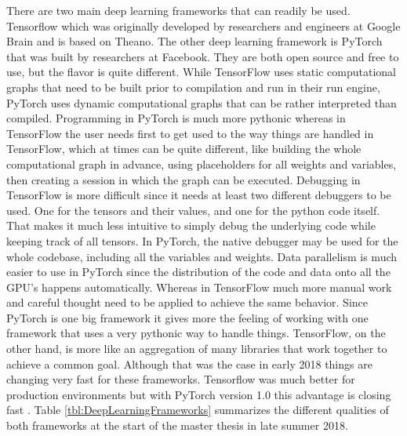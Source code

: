 There are two main deep learning frameworks that can readily be used. Tensorflow \cite{tensorflow} which was originally developed by researchers and engineers at Google Brain and is based on Theano. The other deep learning framework is PyTorch \cite{pytorch} that was built by researchers at Facebook. They are both open source and free to use, but the flavor is quite different. While TensorFlow uses static computational graphs that need to be built prior to compilation and run in their run engine, PyTorch uses dynamic computational graphs that can be rather interpreted than compiled. Programming in PyTorch is much more pythonic whereas in TensorFlow the user needs first to get used to the way things are handled in TensorFlow, which at times can be quite different, like building the whole computational graph in advance, using placeholders for all weights and variables, then creating a session in which the graph can be executed. Debugging in TensorFlow is more difficult since it needs at least two different debuggers to be used. One for the tensors and their values, and one for the python code itself. That makes it much less intuitive to simply debug the underlying code while keeping track of all tensors. In PyTorch, the native debugger may be used for the whole codebase, including all the variables and weights. Data parallelism is much easier to use in PyTorch since the distribution of the code and data onto all the GPU's happens automatically. Whereas in TensorFlow much more manual work and careful thought need to be applied to achieve the same behavior. Since PyTorch is one big framework it gives more the feeling of working with one framework that uses a very pythonic way to handle things. TensorFlow, on the other hand, is more like an aggregation of many libraries that work together to achieve a common goal. Although that was the case in early 2018 things are changing very fast for these frameworks. Tensorflow was much better for production environments but with PyTorch version 1.0 this advantage is closing fast \cite{pytorchOnePointZero}. Table \ref{tbl:DeepLearningFrameworks} summarizes the different qualities of both frameworks at the start of the master thesis in late summer 2018. \\

